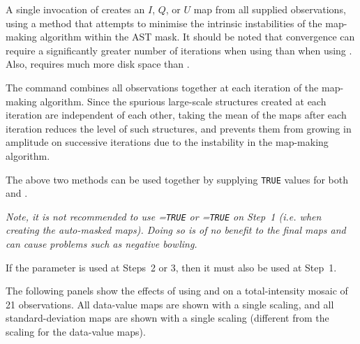 \begin{enumerate}
A single invocation of  creates an $I$, $Q$, or $U$ map from all
supplied observations, using a method that attempts to minimise the
intrinsic instabilities of the map-making algorithm within the AST mask.
It should be noted that convergence can require a significantly greater number
of iterations when using  than when using . Also,
 requires much more disk space than .

The  command combines all observations together at each
iteration of the map-making algorithm. Since the spurious large-scale
structures created at each iteration are independent of each other,
taking the mean of the maps after each iteration reduces the level of such
structures, and prevents them from growing in amplitude on successive
iterations due to the instability in the map-making algorithm.

\end{enumerate}

The above two methods can be used together by supplying \texttt{TRUE}
values for both  and .

\begin{center}
\emph{Note, it is not recommended to use =\texttt{TRUE} or
=\texttt{TRUE} on Step~1 (i.e. when creating the auto-masked
maps). Doing so is of no benefit to the final maps and can cause problems
such as negative bowling.}
\end{center}

If the  parameter is used at Steps~2 or 3, then it must
also be used at Step~1.

The following panels show the effects of using  and
 on a total-intensity mosaic of 21 observations. All
data-value maps are shown with a single scaling, and all standard-deviation
maps are shown with a single scaling (different from the scaling
for the data-value maps).

\newlength{\picwid}
\latexhtml{\setlength{\picwid}{0.3\linewidth}}{\setlength{\picwid}{0.9\linewidth}}

